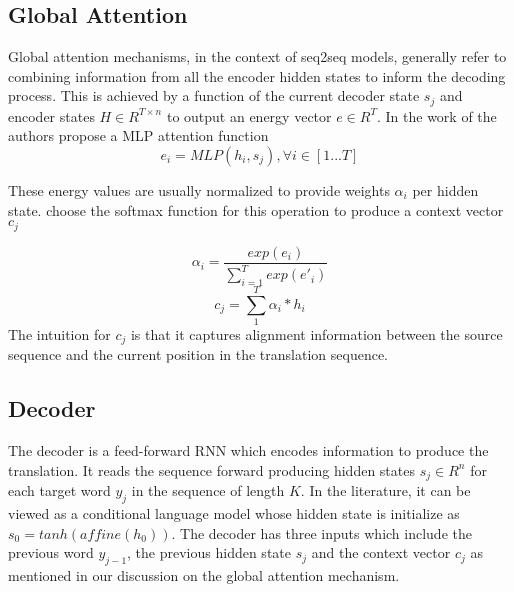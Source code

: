 \subsection{Global Attention}

Global attention mechanisms, in the context of \ac{seq2seq} models, generally refer to combining information from all the encoder hidden states to inform the decoding process. This is achieved by a function of the current decoder state $s_{j}$ and encoder states $H \in R^{T \times n}$ to output an energy vector $e \in R^{T}$. In the work of \citet{bahdanau2014NMTBYJoint} the authors propose a \ac{MLP} attention function
\begin{equation}
e_{i} = MLP(h_{i}, s_{j}), \forall i \in [1...T]
\end{equation}


These energy values are usually normalized to provide weights $\alpha_{i}$ per hidden state. \citet{bahdanau2014NMTBYJoint} choose the softmax function for this operation to produce a context vector $c_{j}$

\begin{equation}
	\alpha_{i} = \frac{exp(e_{i})}{\sum_{i=1}^{T} exp(e'_{i})}
\end{equation}
\begin{equation}
c_{j} = \sum_{1}^{T} \alpha_{i} * h_{i}
\end{equation}
The intuition for $c_{j}$ is that it captures alignment information between the source sequence and the current position in the translation sequence. %

 




\subsection{Decoder}


The decoder is a feed-forward \ac{RNN} which encodes information to produce the translation. It reads the sequence forward producing hidden states $s_{j} \in R^{n}$ for each target word $y_{j}$ in the sequence of length $K$. In the literature, it can be viewed as a conditional language model \cite{koehn2017NMT} whose hidden state is initialize as $s_{0} = tanh(affine(h_{0}))$. The decoder has three inputs which include the previous word $y_{j-1}$, the previous hidden state $s_{j}$ and the context vector $c_{j}$ as mentioned in our discussion on the global attention mechanism. 



